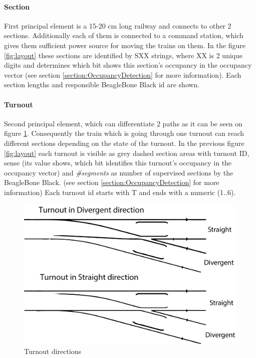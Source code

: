 \paragraph{Section} 
First principal  element is a 15-20 cm long railway and connects to other 2 sections. Additionally each of them is connected to a command station, which gives them sufficient power source for moving the trains on them. In the figure \ref{fig:layout} these sections are identified by SXX strings, where XX is 2 unique digits and determines which bit shows this section's occupancy in the occupancy vector (see section \ref{section:OccupancyDetection} for more information). Each section lengths and responsible BeagleBone Black id are shown.
\paragraph{Turnout}
Second principal element, which can differentiate 2 paths as it can be seen on figure \ref{fig:turnoutDir}. Consequently the train which is going through one turnout can reach different sections depending on the state of the turnout. In the previous figure \ref{fig:layout} each turnout is visible as grey dashed section areas with turnout ID, sense (its value shows, which bit identifies this turnout's occupancy in the occupancy vector) and \textit{\#segments} as number of supervised sections by the BeagleBone Black. (see section \ref{section:OccupancyDetection} for more information) Each turnout id starts with T and ends with a numeric (1..6). 
\begin{figure}[!ht]
	\centering
	\includegraphics[width=150mm]{figures/modes3/turnout.png}
	\caption{Turnout directions}
	\label{fig:turnoutDir}
\end{figure}

